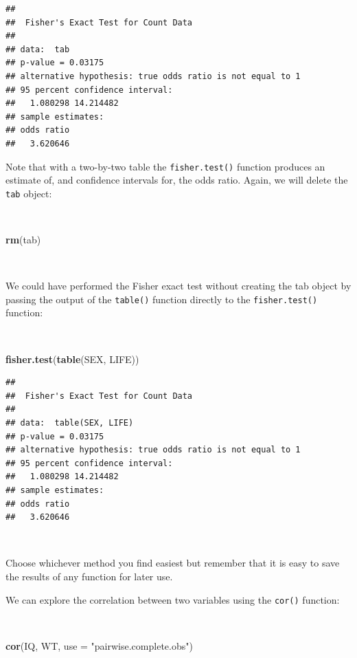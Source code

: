 \documentclass[12pt,a4paper]{book}
\newenvironment{Shaded}{\begin{snugshade}}{\end{snugshade}}
\newcommand{\KeywordTok}[1]{\textcolor[rgb]{0.13,0.29,0.53}{\textbf{#1}}}
\newcommand{\DataTypeTok}[1]{\textcolor[rgb]{0.13,0.29,0.53}{#1}}
\newcommand{\StringTok}[1]{\textcolor[rgb]{0.31,0.60,0.02}{#1}}
\newcommand{\NormalTok}[1]{#1}
\theoremstyle{definition}
\theoremstyle{definition}
\theoremstyle{definition}
\theoremstyle{remark}
\begin{document}
\begin{verbatim}
## 
##  Fisher's Exact Test for Count Data
## 
## data:  tab
## p-value = 0.03175
## alternative hypothesis: true odds ratio is not equal to 1
## 95 percent confidence interval:
##   1.080298 14.214482
## sample estimates:
## odds ratio 
##   3.620646
\end{verbatim}

\newpage

Note that with a two-by-two table the \texttt{fisher.test()} function
produces an estimate of, and confidence intervals for, the odds ratio.
Again, we will delete the \texttt{tab} object:

~

\begin{Shaded}
\begin{Highlighting}[]
\KeywordTok{rm}\NormalTok{(tab)}
\end{Highlighting}
\end{Shaded}

~

We could have performed the Fisher exact test without creating the tab
object by passing the output of the \texttt{table()} function directly
to the \texttt{fisher.test()} function:

~

\begin{Shaded}
\begin{Highlighting}[]
\KeywordTok{fisher.test}\NormalTok{(}\KeywordTok{table}\NormalTok{(SEX, LIFE))}
\end{Highlighting}
\end{Shaded}

\begin{verbatim}
## 
##  Fisher's Exact Test for Count Data
## 
## data:  table(SEX, LIFE)
## p-value = 0.03175
## alternative hypothesis: true odds ratio is not equal to 1
## 95 percent confidence interval:
##   1.080298 14.214482
## sample estimates:
## odds ratio 
##   3.620646
\end{verbatim}

~

Choose whichever method you find easiest but remember that it is easy to
save the results of any function for later use.

We can explore the correlation between two variables using the
\texttt{cor()} function:

~

\begin{Shaded}
\begin{Highlighting}[]
\KeywordTok{cor}\NormalTok{(IQ, WT, }\DataTypeTok{use =} \StringTok{"pairwise.complete.obs"}\NormalTok{)}
\end{Highlighting}
\end{Shaded}
\end{document}
